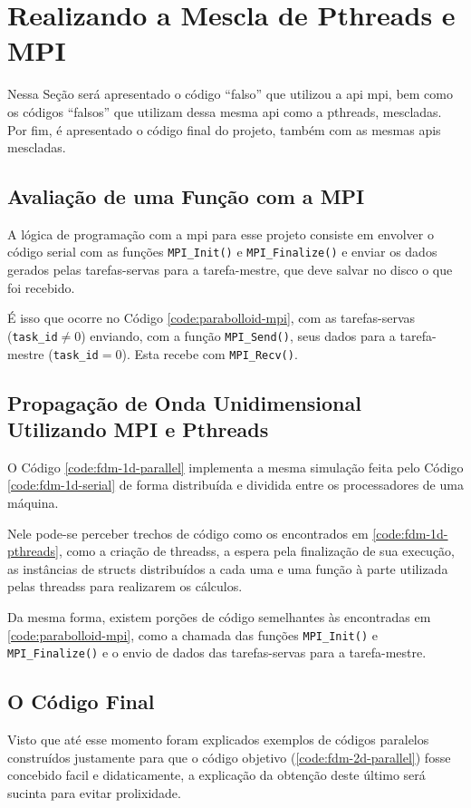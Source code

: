 \section{Realizando a Mescla de Pthreads e MPI}
Nessa Seção será apresentado o código ``falso'' que utilizou a \acrshort{api} \acrshort{mpi}, bem como os códigos ``falsos'' que utilizam dessa mesma \acrshort{api} como a \acrshort{pthreads}, mescladas. Por fim, é apresentado o código final do projeto, também com as mesmas \acrshort{api}s mescladas.

\subsection{Avaliação de uma Função com a MPI}
A lógica de programação com a \acrshort{mpi} para esse projeto consiste em envolver o código serial com as funções \texttt{MPI\_Init()} e \texttt{MPI\_Finalize()} e enviar os dados gerados pelas tarefas-servas para a tarefa-mestre, que deve salvar no disco o que foi recebido. 

É isso que ocorre no Código \ref{code:parabolloid-mpi}, com as tarefas-servas (\texttt{task\_id}$\neq 0$) enviando, com a função \texttt{MPI\_Send()}, seus dados para a tarefa-mestre (\texttt{task\_id}$= 0$). Esta recebe com \texttt{MPI\_Recv()}. 

\subsection{Propagação de Onda Unidimensional Utilizando MPI e Pthreads}
O Código \ref{code:fdm-1d-parallel} implementa a mesma simulação feita pelo Código \ref{code:fdm-1d-serial} de forma distribuída e dividida entre os processadores de uma máquina. 

Nele pode-se perceber trechos de código como os encontrados em \ref{code:fdm-1d-pthreads}, como a criação de \glspl{threads}, a espera pela finalização de sua execução, as instâncias de \glspl{struct} distribuídos a cada uma e uma função à parte utilizada pelas \glspl{threads} para realizarem os cálculos.

Da mesma forma, existem porções de código semelhantes às encontradas em \ref{code:parabolloid-mpi}, como a chamada das funções \texttt{MPI\_Init()} e \texttt{MPI\_Finalize()} e o envio de dados das tarefas-servas para a tarefa-mestre.

\subsection{O Código Final}
Visto que até esse momento foram explicados exemplos de códigos paralelos construídos justamente para que o código objetivo (\ref{code:fdm-2d-parallel}) fosse concebido facil e didaticamente, a explicação da obtenção deste último será sucinta para evitar prolixidade.


